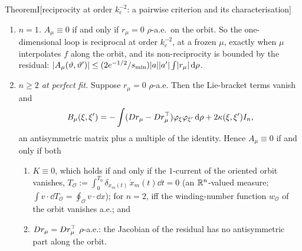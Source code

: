 \begin{thm}{Theorem}{I}[reciprocity at order $k_e^{-2}$: a pairwise criterion and its characterisation]
\begin{enumerate}[label=(\roman*)]
\begin{gather}
\begin{aligned}
          -\int r_\mu(\nabla\varphi_\xi)^\T\varphi_{\xi'}\dd\rho\\
        &+\int(\nabla\varphi_{\xi'})r_\mu^\T\varphi_\xi\dd\rho+2\kappa(\xi,\xi')I_n,
      \end{aligned}\label{eq:finitegain:B}\\
      \kappa(\xi,\xi'):=\Bigl\langle\varphi_\xi(x_m(t))\cdot\frac{\mathrm{d}}{\mathrm{d}t}\varphi_{\xi'}(x_m(t))\Bigr\rangle_t,
        \label{eq:finitegain:kappa}
    \end{gather}
    so $A_\mu\equiv0$ if and only if $B_\mu(\xi,\xi')=0$ for all admissible $\xi,\xi'$. The first term is the curl of
    the residual paired with the features, the next two are the residual paired with the Lie bracket of the feature
    fields, and the last is the circulation kernel $K(\vartheta,\vartheta')=(a^\T a')\kappa(\xi,\xi')$. The
    performative part is bounded by the residual and by the antisymmetric part of its Jacobian along the orbit:
    \[
      \abs{A_{\mathrm{even}}(\vartheta,\vartheta')}\le\abs{a}\abs{a'}\Bigl[\int\norm{Dr_\mu-Dr_\mu^\T}\dd\rho
        +\frac{2e^{-1/2}}{s_{\min}}\int\abs{r_\mu}\dd\rho\Bigr].
    \]
  \item \emph{$n=1$.} $A_\mu\equiv0$ if and only if $r_\mu=0$ $\rho$-a.e.\ on the orbit. So the one-dimensional loop
    is reciprocal at order $k_e^{-2}$, at a frozen $\mu$, exactly when $\mu$ interpolates $f$ along the orbit, and its
    non-reciprocity is bounded by the residual:
    $\lvert A_\mu(\vartheta,\vartheta')\rvert\le(2e^{-1/2}/s_{\min})\lvert a\rvert\lvert a'\rvert\int\lvert r_\mu\rvert\,\mathrm{d}\rho$.
  \item \emph{$n\ge2$ at perfect fit.} Suppose $r_\mu=0$ $\rho$-a.e. Then the Lie-bracket terms vanish and
    \[
      B_\mu(\xi,\xi')=-\int(Dr_\mu-Dr_\mu^\top)\varphi_\xi\varphi_{\xi'}\,\mathrm{d}\rho+2\kappa(\xi,\xi')I_n,
    \]
    an antisymmetric matrix plus a multiple of the identity. Hence $A_\mu\equiv0$ if and only if both
    \begin{enumerate}[label=(\alph*)]
      \item $K\equiv0$, which holds if and only if the $1$-current of the oriented orbit vanishes,
        $T_{\mathcal{O}}:=\int_0^{T_0}\delta_{x_m(t)}\,\dot x_m(t)\dd t=0$ (an $\mathbb{R}^n$-valued measure;
        $\int v\cdot\dd T_{\mathcal{O}}=\oint_{\mathcal{O}}v\cdot\dd x$); for $n=2$, iff the winding-number function
        $w_{\mathcal{O}}$ of the orbit vanishes a.e.; and
      \item $Dr_\mu=Dr_\mu^\top$ $\rho$-a.e.: the Jacobian of the residual has no antisymmetric part along the orbit.

\end{enumerate}
\end{enumerate}
\end{thm}
